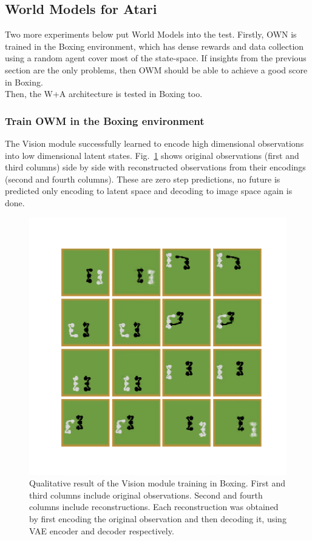 \subsection{World Models for Atari}

Two more experiments below put World Models into the test. Firstly, OWN is trained in the Boxing environment, which has dense rewards and data collection using a random agent cover most of the state-space. If insights from the previous section are the only problems, then OWM should be able to achieve a good score in Boxing. \\
Then, the W+A architecture is tested in Boxing too.

\subsubsection{Train OWM in the Boxing environment}

The Vision module successfully learned to encode high dimensional observations into low dimensional latent states. Fig.~\ref{Fig.WM_Boxing_vision} shows original observations (first and third columns) side by side with reconstructed observations from their encodings (second and fourth columns). These are zero step predictions, no future is predicted only encoding to latent space and decoding to image space again is done.

\begin{figure}[H]
\includegraphics[width=1\textwidth,keepaspectratio]{figures/Boxing_vision.png}
\caption[Qualitative result of the World Models' Vision module training in Boxing]{Qualitative result of the Vision module training in Boxing. First and third columns include original observations. Second and fourth columns include reconstructions. Each reconstruction was obtained by first encoding the original observation and then decoding it, using VAE encoder and decoder respectively.}
\label{Fig.WM_Boxing_vision}
\end{figure}

